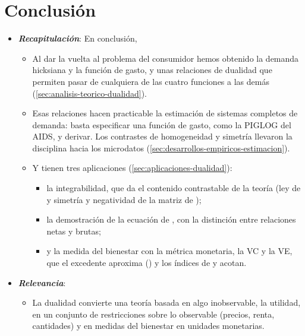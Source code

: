 \documentclass[11pt]{article}
\begin{document}
\section*{Conclusión}

\begin{itemize}
\item \textbf{\emph{Recapitulación}}: En conclusión,
  \begin{itemize}
  \item Al dar la vuelta al problema del consumidor hemos obtenido la demanda hicksiana y la función de gasto, y unas relaciones de dualidad que permiten pasar de cualquiera de las cuatro funciones a las demás (\ref{sec:analisis-teorico-dualidad}).
  \item Esas relaciones hacen practicable la estimación de sistemas completos de demanda: basta especificar una función de gasto, como la PIGLOG del AIDS, y derivar. Los contrastes de homogeneidad y simetría llevaron la disciplina hacia los microdatos (\ref{sec:desarrollos-empiricos-estimacion}).
  \item Y tienen tres aplicaciones (\ref{sec:aplicaciones-dualidad}):
    \begin{itemize}
    \item la integrabilidad, que da el contenido contrastable de la teoría (ley de  y simetría y negatividad de la matriz de );
    \item la demostración de la ecuación de , con la distinción entre relaciones netas y brutas;
    \item y la medida del bienestar con la métrica monetaria, la VC y la VE, que el excedente aproxima () y los índices de  y  acotan.
    \end{itemize}
  \end{itemize}
\item \textbf{\emph{Relevancia}}:
  \begin{itemize}
  \item La dualidad convierte una teoría basada en algo inobservable, la utilidad, en un conjunto de restricciones sobre lo observable (precios, renta, cantidades) y en medidas del bienestar en unidades monetarias.


\end{itemize}
\end{itemize}
\end{document}
